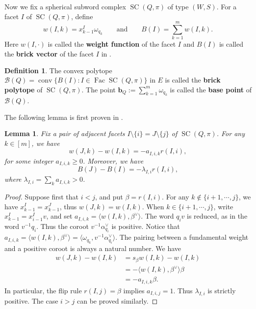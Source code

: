 \documentclass[11pt,a4paper]{article}
\newtheorem{lemma}[theorem]{Lemma}
\theoremstyle{definition}
\newtheorem{definition}[theorem]{Definition}
\theoremstyle{remark}
\newcommand{\SC}{\operatorname{SC}}
\newcommand{\conv}{\operatorname{conv}}
\newcommand{\Fac}{\operatorname{Fac}}
\numberwithin{equation}{section}
\begin{document}
Now we fix a spherical subword complex $\SC(Q,\pi)$ of type $(W,S)$. For a facet $I$ of $\SC(Q,\pi)$, define
\begin{equation}\label{eq:km-weights}
w(I,k)=x_{k-1}^I\omega_{q_k} \qquad \text{and} \qquad
B(I)=\sum_{k=1}^m w(I,k).
\end{equation}
Here $w(I,\cdot)$ is called the \textbf{weight function} of the facet $I$ and $B(I)$ is called the \textbf{brick vector} of the facet $I$ in \cite[Definition~4.1]{PSbrick}.
\begin{definition}\label{def:brick polytope}
    The convex polytope $\mathcal B(Q)=\conv\{B(I):I\in\Fac\SC (Q,\pi)\}$ in $E$ is called the \textbf{brick polytope} of $\SC(Q,\pi)$. The point $\mathbf{b}_Q:=\sum_{k=1}^m \omega_{q_k}$ is called the \textbf{base point} of $\mathcal B(Q)$.
\end{definition}

The following lemma is first proven in \cite[Lemma~4.4 and Lemma~4.5]{PSbrick}.
\begin{lemma}\label{lem:weight-flip}
Fix a pair of adjacent facets $I\setminus\{i\}=J\setminus\{j\}$ of $\SC(Q,\pi)$. For any $k\in [m]$, we have 
\begin{equation}\label{eq:km-weight-flip}
w(J,k)-w(I,k)=-a_{I,i,k}r(I,i),
\end{equation}
for some integer $a_{I,i,k}\geq 0$. Moreover, we have 
\begin{equation}\label{eq:km-brick-flip}
B(J)-B(I)=-\lambda_{I,i}r(I,i),
\end{equation}
where $\lambda_{I,i}=\sum_k a_{I,i,k}>0$.
\end{lemma}

\begin{proof}
Suppose first that $i<j$, and put $\beta=r(I,i)$.
For any $k\notin \{i+1,\cdots,j\}$, we have $x^I_{k-1}=x^J_{k-1}$, thus $w(J,k)=w(I,k)$. When $k\in \{i+1,\cdots,j\}$, write $x_{k-1}^I=x_{i-1}^Iv$, and set $a_{I,i,k}=\langle w(I,k),\beta^\vee\rangle$. The word $q_iv$ is reduced, as in the word $v^{-1}q_i$. Thus the coroot $v^{-1}\alpha^\vee_{q_i}$ is positive. Notice that $a_{I,i,k}=\langle w(I,k),\beta^\vee\rangle=\langle\omega_{q_k},v^{-1}\alpha_{q_i}^\vee\rangle$. The pairing between a fundamental weight and a positive coroot is always a natural number. We have
\begin{equation}\label{eq:coroot-coefficient}
\begin{aligned}
w(J,k)-w(I,k) &=s_{\beta}w(I,k)-w(I,k)\\
              &=-\langle w(I,k),\beta^\vee\rangle\beta\\
              &=-a_{I,i,k}\beta.
\end{aligned}
\end{equation}
In particular, the flip rule $r(I,j)=\beta$ implies $a_{I,i,j}=1$.
Thus $\lambda_{I,i}$ is strictly positive. The case $i>j$ can be proved similarly.
\end{proof}
\end{document}

